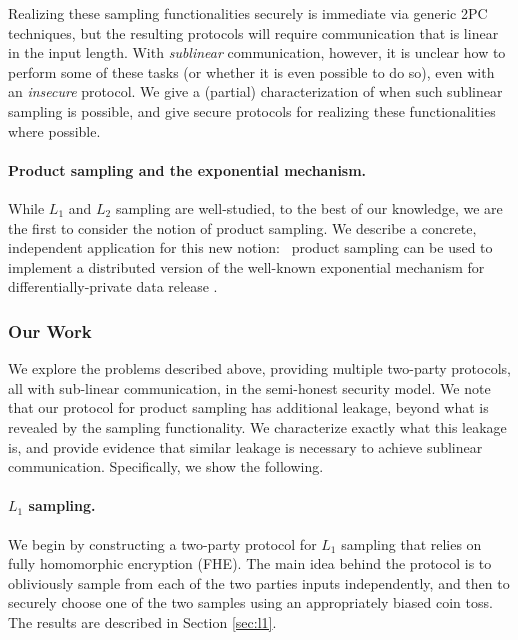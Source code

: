 Realizing these sampling functionalities securely is immediate via
generic 2PC techniques, but the resulting protocols will require
communication that is linear in the input length.  With \emph{sublinear}
communication, however, it is unclear how to perform some of these tasks
(or whether it is even possible to do so), even with an \emph{insecure}
protocol.  We give a (partial) characterization of when such sublinear
sampling is possible, and give secure protocols for realizing these
functionalities where possible.


\paragraph{Product sampling and the exponential mechanism.}
While $L_1$ and $L_2$ sampling are well-studied, to the best of our
knowledge, we are the first to consider the notion of product sampling.
We describe  a concrete, independent application for
this new notion:~
product sampling can be used to implement a distributed version of the
well-known exponential mechanism for differentially-private data release
\cite{FOCS:McSTal07}.


\subsubsection{Our Work} 
We explore the problems described above, providing multiple two-party
protocols, all with sub-linear communication, in the semi-honest
security model.  We note that our protocol for product sampling  has additional
leakage, beyond  what is revealed by the sampling functionality.  We characterize exactly what this leakage is, and
provide evidence that similar leakage is necessary to achieve sublinear
communication.  
Specifically, we show the following.

\paragraph{$L_1$ sampling.} We begin by constructing a two-party
protocol for $L_1$ sampling that relies on fully homomorphic encryption (FHE).
The main idea behind the protocol is to obliviously sample from each of
the two parties inputs independently, and then to securely choose one of
the two samples using an appropriately biased coin toss.  The results
are described in Section \ref{sec:l1}. 
%

